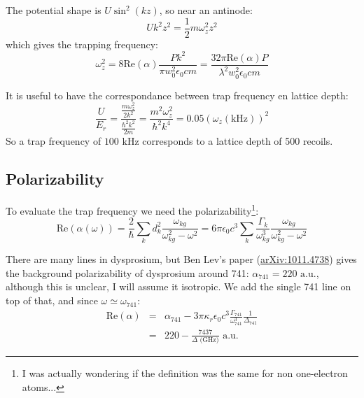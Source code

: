 \documentclass[reprint,amsmath,amssymb,aps,nofootinbib]{revtex4-1}
\begin{document}
The potential shape is $U\sin^{2}(kz)$, so near an antinode:
\begin{equation}
\label{trap_freq_depth}
Uk^{2}z^{2}=\frac12m\omega_{z}^{2}z^{2}
\end{equation}
which gives the trapping frequency:
\begin{equation}
\label{trap_frequency}
\omega_{z}^{2} = 8\text{Re}(\alpha)\frac{Pk^{2}}{\pi w_{0}^{2}\epsilon_{0}cm}= \frac{32\pi\text{Re}(\alpha) P}{\lambda^{2} w_{0}^{2}\epsilon_{0}cm}
\end{equation}

It is useful to have the correspondance between trap frequency en lattice depth:
\begin{equation}
\frac{U}{E_{r}}=\frac{\frac{m\omega_{z}^{2}}{2k^{2}}}{\frac{\hbar^{2}k^{2}}{2m}} = \frac{m^{2}\omega_{z}^{2}}{\hbar^{2}k^{4}} = 0.05 (\omega_{z}(\text{kHz}))^{2}
\end{equation}
So a trap frequency of $100 \text{ kHz}$ corresponds to a lattice depth of 500 recoils.

\subsection{Polarizability}

To evaluate the trap frequency we need the polarizability\footnote{I was actually wondering if the definition was the same for non one-electron atoms...}:
\begin{equation}
\text{Re}\left(\alpha(\omega)\right) = \frac{2}{\hbar}\sum_{k} d_{k}^{2}\frac{\omega_{kg}}{\omega_{kg}^{2}-\omega^{2}} = 6\pi\epsilon_{0}c^{3}\sum_{k}\frac{\Gamma_{k}}{\omega_{kg}^{3}}\frac{\omega_{kg}}{\omega_{kg}^{2}-\omega^{2}}
\end{equation}

There are many lines in dysprosium, but Ben Lev's paper (\url{arXiv:1011.4738}) gives the background polarizability of dysprosium around 741: $\alpha_{741} = 220 \text{ a.u.}$, although this is unclear, I will assume it isotropic. We add the single 741 line on top of that, and since $\omega \simeq \omega_{741}$:
\begin{equation}
\begin{array}{llll}
\text{Re}(\alpha) &=& \alpha_{741} - 3\pi\kappa_{r}\epsilon_{0}c^{3}\frac{\Gamma_{741}}{\omega_{741}^{3}}\frac{1}{\Delta_{741}} \\[10pt]
	&=& 220 - \frac{7437}{\Delta\text{ (GHz)}}\text{ a.u.}
\end{array}
\end{equation}
\end{document}

